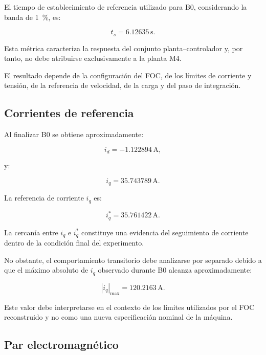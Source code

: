 El tiempo de establecimiento de referencia utilizado para B0, considerando la banda de \SI{1}{\percent}, es:

\begin{equation}
t_s=
6.12635\,\mathrm{s}.
\end{equation}

Esta métrica caracteriza la respuesta del conjunto planta--controlador y, por tanto, no debe atribuirse exclusivamente a la planta M4.

El resultado depende de la configuración del FOC, de los límites de corriente y tensión, de la referencia de velocidad, de la carga y del paso de integración.

\subsection{Corrientes de referencia}

Al finalizar B0 se obtiene aproximadamente:

\begin{equation}
i_d=-1.122894\,\mathrm{A},
\end{equation}

y:

\begin{equation}
i_q=35.743789\,\mathrm{A}.
\end{equation}

La referencia de corriente $i_q$ es:

\begin{equation}
i_q^\ast=
35.761422\,\mathrm{A}.
\end{equation}

La cercanía entre $i_q$ e $i_q^\ast$ constituye una evidencia del seguimiento de corriente dentro de la condición final del experimento.

No obstante, el comportamiento transitorio debe analizarse por separado debido a que el máximo absoluto de $i_q$ observado durante B0 alcanza aproximadamente:

\begin{equation}
|i_q|_{\max}
=
120.2163\,\mathrm{A}.
\end{equation}

Este valor debe interpretarse en el contexto de los límites utilizados por el FOC reconstruido y no como una nueva especificación nominal de la máquina.

\subsection{Par electromagnético}

